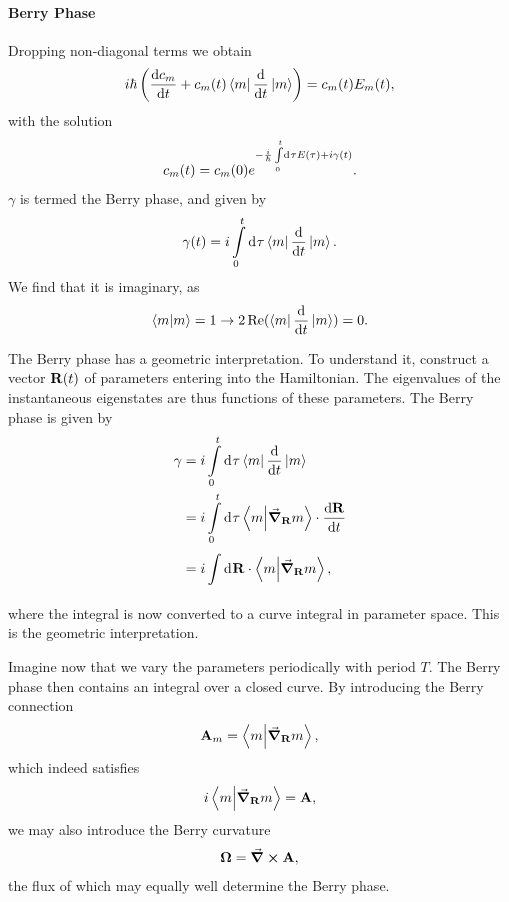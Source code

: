 \paragraph{Berry Phase}
Dropping non-diagonal terms we obtain
\begin{align*}
	i\hbar\left(\dv{c_{m}}{t} + c_{m}(t)\bra{m}\dv{t}\ket{m}\right) = c_{m}(t)E_{m}(t),
\end{align*}
with the solution
\begin{align*}
	c_{m}(t) = c_{m}(0)e^{-\frac{i}{\hbar}\int\limits_{0}^{t}\dd[]{\tau}E(\tau) + i\gamma(t)}.
\end{align*}
$\gamma$ is termed the Berry phase, and given by
\begin{align*}
	\gamma(t) = i\int\limits_{0}^{t}\dd[]{\tau}\bra{m}\dv{t}\ket{m}.
\end{align*}
We find that it is imaginary, as
\begin{align*}
	\braket{m} = 1 \rightarrow 2\Re(\bra{m}\dv{t}\ket{m}) = 0.
\end{align*}

The Berry phase has a geometric interpretation. To understand it, construct a vector $\vb{R}(t)$ of parameters entering into the Hamiltonian. The eigenvalues of the instantaneous eigenstates are thus functions of these parameters. The Berry phase is given by
\begin{align*}
	\gamma &= i\int\limits_{0}^{t}\dd[]{\tau}\bra{m}\dv{t}\ket{m} \\
	       &= i\int\limits_{0}^{t}\dd[]{\tau}\braket{m}{\grad_{\vb{R}}{m}}\cdot\dv{\vb{R}}{t} \\
	       &= i\int\limits_{}^{}\dd[]{\vb{R}}\cdot\braket{m}{\grad_{\vb{R}}{m}},
\end{align*}
where the integral is now converted to a curve integral in parameter space. This is the geometric interpretation.

Imagine now that we vary the parameters periodically with period $T$. The Berry phase then contains an integral over a closed curve. By introducing the Berry connection
\begin{align*}
	\vb{A}_{m} = \braket{m}{\grad_{\vb{R}}{m}},
\end{align*}
which indeed satisfies
\begin{align*}
	i\braket{m}{\grad_{\vb{R}}{m}} = \vb{A},
\end{align*}
we may also introduce the Berry curvature
\begin{align*}
	\vb*{\Omega} = \curl{\vb{A}},
\end{align*}
the flux of which may equally well determine the Berry phase.

